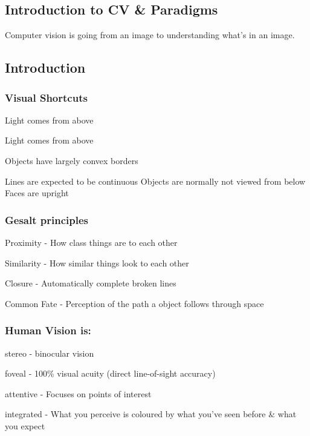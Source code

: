 \documentclass[8pt]{extarticle}
\begin{document}
\begin{multicols}{2}
\section{Introduction to CV \& Paradigms}
Computer vision is going from an image to understanding what's in an image.

\subsection{Introduction}
\subsubsection{Visual Shortcuts}
\begin{compactitem}
    \item Light comes from above
    \item Light comes from above
    \item Objects have largely convex borders
    \item Lines are expected to be continuous Objects are normally not viewed from below Faces are upright
\end{compactitem}

\subsubsection{Gesalt principles}
\begin{compactitem}
    \item Proximity - How class things are to each other
    \item Similarity - How similar things look to each other
    \item Closure - Automatically complete broken lines
    \item Common Fate - Perception of the path a object follows through space
\end{compactitem}

\subsubsection{Human Vision is:}
\begin{compactitem}
    \item stereo - binocular vision
    \item foveal - 100\% visual acuity (direct line-of-sight accuracy)
    \item attentive - Focuses on points of interest
    \item integrated - What you perceive is coloured by what you've seen before \& what you expect
\end{compactitem}



\end{multicols}
\end{document}
